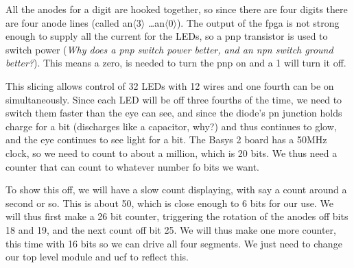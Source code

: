 
All the anodes for a digit are hooked together, so since there are four digits there are four anode lines (called an$\langle 3\rangle$ \ldots an$\langle 0\rangle$).  The output of the fpga is not strong enough to supply all the current for the LEDs, so a pnp transistor is used to switch power (\emph{Why does a pnp switch power better, and an npn switch ground better?}).  This means a zero, is needed to turn the pnp on and a 1 will turn it off.

This slicing allows control of 32 LEDs with 12 wires and one fourth can be on simultaneously.  Since each LED will be off three fourths of the time, we need to switch them faster than the eye can see, and since the diode's pn junction holds charge for a bit (discharges like a capacitor, why?) and thus continues to glow, and the eye continues to see light for a bit.  The Basys 2 board has a 50MHz clock, so we need to count to about a million, which is 20 bits.  We thus need a counter that can count to whatever number fo bits we want.  


To show this off, we will have a slow count displaying, with say a count around a second or so.  This is about 50, which is close enough to 6 bits for our use.  We will thus first make a 26 bit counter, triggering the rotation of the anodes off bits 18 and 19, and the next count off bit 25.  We will thus make one more counter, this time with 16 bits so we can drive all four segments.  We just need to change our top level module and ucf to reflect this.

